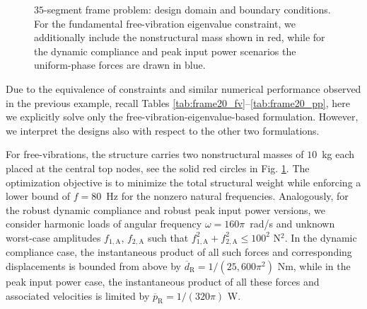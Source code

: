 \documentclass[preprint,3p]{elsarticle}
\newcommand{\A}{\mathrm{A}}
\newcommand{\R}{\mathrm{R}}
\numberwithin{equation}{section}
\begin{document}
\begin{figure}[!t]
\begin{subfigure}[t]{0.8\linewidth}
{}
		\caption{}
		\end{subfigure}%
\caption{$35$-segment frame problem: design domain and boundary conditions. For the fundamental free-vibration eigenvalue constraint, we additionally include the nonstructural mass shown in red, while for the dynamic compliance and peak input power scenarios the uniform-phase forces are drawn in blue.}
\label{fig:frame35}
\end{figure}

Due to the equivalence of constraints and similar numerical performance observed in the previous example, recall Tables \ref{tab:frame20_fv}--\ref{tab:frame20_pp}, here we explicitly solve only the free-vibration-eigenvalue-based formulation. However, we interpret the designs also with respect to the other two formulations. 

For free-vibrations, the structure carries two nonstructural masses of $10$~kg each placed at the central top nodes, see the solid red circles in Fig. \ref{fig:frame35}. The optimization objective is to minimize the total structural weight while enforcing a lower bound of $f = 80$~Hz for the nonzero natural frequencies. Analogously, for the robust dynamic compliance and robust peak input power versions, we consider harmonic loads of angular frequency $\omega = 160 \pi$~rad/s and unknown worst-case amplitudes $f_{1,\A}$, $f_{2,\A}$ such that $f_{1,\A}^2 + f_{2,\A}^2 \le 100^2$ N$^2$. In the dynamic compliance case, the instantaneous product of all such forces and corresponding displacements is bounded from above by $\overline{d}_\R = 1/(25,600 \pi^2)$ Nm, while in the peak input power case, the instantaneous product of all these forces and associated velocities is limited by $\overline{p}_\R = 1/(320 \pi)$ W. 
\end{document}
